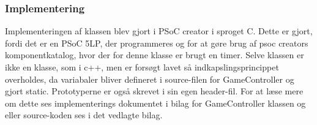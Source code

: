 \documentclass[Rapport/Playerside/GameController/GameController.tex]{subfiles}
\begin{document}
\subsubsection{Implementering}
Implementeringen af klassen blev gjort i PSoC creator i sproget C. Dette er gjort, fordi det er en PSoC 5LP, der programmeres og for at gøre brug af psoc creators komponentkatalog, hvor der for denne klasse er brugt en timer. Selve klassen er ikke en klasse, som i c++, men er forsøgt lavet så indkapslingsprincippet overholdes, da variabaler bliver defineret i source-filen for GameController og gjort static. Prototyperne er også skrevet i sin egen header-fil. For at læse mere om dette ses implementerings dokumentet i bilag for GameController klassen og eller source-koden ses i det vedlagte bilag. 
\end{document}
